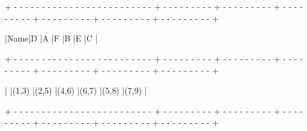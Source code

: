 \newpage
\begin{tcolorbox}
{\tiny{+ - - - - - - - - - - - - - - - - - - - - - - - - - + - - - - - - - - - + - - - - - - - - - + - - - - - - - - - + - - - - - - - - - + - - - - - - - - - + - - - - - - - - - +}}

\hspace{0.4mm}|\hspace{17.6mm}Name\hspace{17.6mm}|\hspace{6.57mm}D\hspace{6.57mm} |\hspace{6.57mm}A\hspace{6.57mm} |\hspace{6.57mm}F\hspace{6.57mm} |\hspace{6.57mm}B\hspace{6.57mm} |\hspace{6.57mm}E\hspace{6.57mm} |\hspace{6.8mm}C\hspace{6.8mm} |

{\tiny{+ - - - - - - - - - - - - - - - - - - - - - - - - - + - - - - - - - - - + - - - - - - - - - + - - - - - - - - - + - - - - - - - - - + - - - - - - - - - + - - - - - - - - - +}}

\hspace{0.4mm}|\hspace{0.7mm}
|\hspace{3.85mm}(1,3)\hspace{3.85mm} |\hspace{3.85mm}(2,5)\hspace{3.85mm} |\hspace{3.85mm}(4,6)\hspace{3.85mm} |\hspace{3.85mm}(6,7)\hspace{3.85mm} |\hspace{3.85mm}(5,8)\hspace{3.85mm} |\hspace{3.85mm}(7,9)\hspace{3.85mm} |

{\tiny{+ - - - - - - - - - - - - - - - - - - - - - - - - - + - - - - - - - - - + - - - - - - - - - + - - - - - - - - - + - - - - - - - - - + - - - - - - - - - + - - - - - - - - - +}}


\end{tcolorbox}
